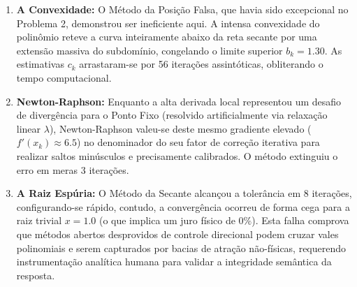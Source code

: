 \begin{enumerate}
    \item \textbf{A Convexidade:} O Método da Posição Falsa, que havia sido excepcional no Problema 2, demonstrou ser ineficiente aqui. A intensa convexidade do polinômio reteve a curva inteiramente abaixo da reta secante por uma extensão massiva do subdomínio, congelando o limite superior $b_k = 1.30$. As estimativas $c_k$ arrastaram-se por 56 iterações assintóticas, obliterando o tempo computacional.
    \item \textbf{Newton-Raphson:} Enquanto a alta derivada local representou um desafio de divergência para o Ponto Fixo (resolvido artificialmente via relaxação linear $\lambda$), Newton-Raphson valeu-se deste mesmo gradiente elevado ($f'(x_k) \approx 6.5$) no denominador do seu fator de correção iterativa para realizar saltos minúsculos e precisamente calibrados. O método extinguiu o erro em meras 3 iterações.
    \item \textbf{A Raiz Espúria:} O Método da Secante alcançou a tolerância em 8 iterações, configurando-se rápido, contudo, a convergência ocorreu de forma cega para a raiz trivial $x = 1.0$ (o que implica um juro físico de $0\%$). Esta falha comprova que métodos abertos desprovidos de controle direcional podem cruzar vales polinomiais e serem capturados por bacias de atração não-físicas, requerendo instrumentação analítica humana para validar a integridade semântica da resposta.
\end{enumerate}

